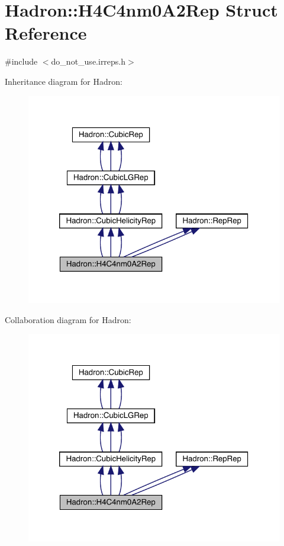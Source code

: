 \hypertarget{structHadron_1_1H4C4nm0A2Rep}{}\section{Hadron\+:\+:H4\+C4nm0\+A2\+Rep Struct Reference}
\label{structHadron_1_1H4C4nm0A2Rep}


{\ttfamily \#include $<$do\+\_\+not\+\_\+use.\+irreps.\+h$>$}



Inheritance diagram for Hadron\+:
\nopagebreak
\begin{figure}[H]
\begin{center}
\leavevmode
\includegraphics[width=320pt]{d2/d48/structHadron_1_1H4C4nm0A2Rep__inherit__graph}
\end{center}
\end{figure}


Collaboration diagram for Hadron\+:
\nopagebreak
\begin{figure}[H]
\begin{center}
\leavevmode
\includegraphics[width=320pt]{d9/d2e/structHadron_1_1H4C4nm0A2Rep__coll__graph}
\end{center}
\end{figure}
